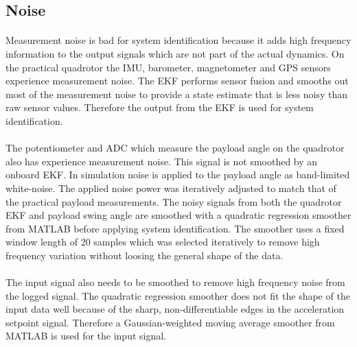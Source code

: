     \subsection{Noise}

        \paragraph{}
        Measurement noise is bad for system identification because it adds high frequency information to the output signals
        which are not part of the actual dynamics.
        On the practical quadrotor the IMU, barometer, magnetometer and GPS sensors experience measurement noise.
        The EKF performs sensor fusion and smooths out most of the measurement noise 
        to provide a state estimate that is less noisy than raw sensor values.
        Therefore the output from the EKF is used for system identification.
        
        \paragraph{}
        The potentiometer and ADC which measure the payload angle on the quadrotor also has experience measurement noise.
        This signal is not smoothed by an onboard EKF.
        In simulation noise is applied to the payload angle as band-limited white-noise.
        The applied noise power was iteratively adjusted to match that of the practical payload measurements.
        The noisy signals from both the quadrotor EKF and payload swing angle are smoothed 
        with a quadratic regression smoother from MATLAB\textsuperscript{\textregistered} before applying system identification.
        The smoother uses a fixed window length of 20 samples which was selected iteratively 
        to remove high frequency variation without loosing the general shape of the data.

        
        
        \paragraph{}
        The input signal also needs to be smoothed to remove high frequency noise from the logged signal.
        The quadratic regression smoother does not fit the shape of the input data well 
        because of the sharp, non-differentiable edges in the acceleration setpoint signal.
        Therefore a Gaussian-weighted moving average smoother 
        from MATLAB\textsuperscript{\textregistered} is used for the input signal.
        
